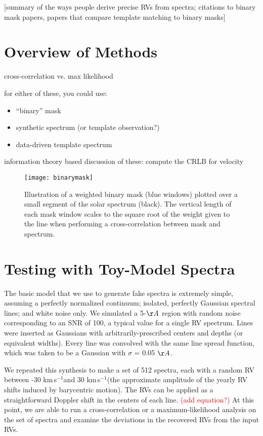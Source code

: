 \documentclass[modern]{aastex61}
\newcommand{\kms}{km\,s$^{-1}$}
\newcommand\todo[1]{\textcolor{red}{#1}}  %
\begin{document}
[summary of the ways people derive precise RVs from spectra; citations to binary mask papers, papers that compare template matching to binary masks]

\section{Overview of Methods}

cross-correlation vs. max likelihood

for either of these, you could use:
\begin{itemize}
\item ``binary'' mask
\item synthetic spectrum (or template observation?)
\item data-driven template spectrum
\end{itemize}

information theory based discussion of these: compute the CRLB for velocity

\begin{figure}
\centering
\texttt{[image: binarymask]}
\caption{Illustration of a weighted binary mask (blue windows) plotted over a small segment of the solar spectrum (black). The vertical length of each mask window scales to the square root of the weight given to the line when performing a cross-correlation between mask and spectrum.}
\label{fig:binarymask}
\end{figure}


\section{Testing with Toy-Model Spectra}

The basic model that we use to generate fake spectra is extremely simple, assuming a perfectly normalized continuum; isolated, perfectly Gaussian spectral lines; and white noise only. We simulated a 5-$\AA$ region with random noise corresponding to an SNR of 100, a typical value for a single RV spectrum. Lines were inserted as Gaussians with arbitrarily-prescribed centers and depths (or equivalent widths). Every line was convolved with the same line spread function, which was taken to be a Gaussian with $\sigma$ = 0.05 $\AA$. %

We repeated this synthesis to make a set of 512 spectra, each with a random RV between -30 \kms and 30 \kms (the approximate amplitude of the yearly RV shifts induced by barycentric motion). The RVs can be applied as a straightforward Doppler shift in the centers of each line. \todo{(add equation?)} At this point, we are able to run a cross-correlation or a maximum-likelihood analysis on the set of spectra and examine the deviations in the recovered RVs from the input RVs.
\end{document}
